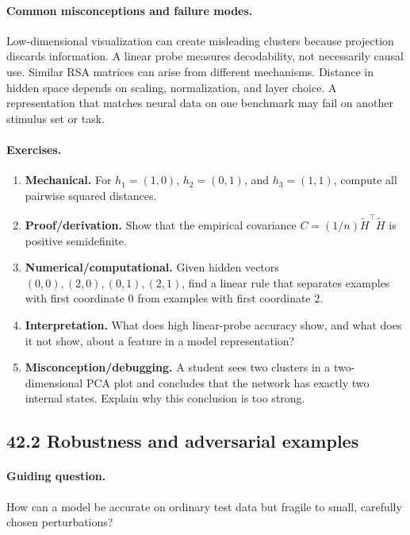 \paragraph{Common misconceptions and failure modes.}
Low-dimensional visualization can create misleading clusters because projection discards information. A linear probe measures decodability, not necessarily causal use. Similar RSA matrices can arise from different mechanisms. Distance in hidden space depends on scaling, normalization, and layer choice. A representation that matches neural data on one benchmark may fail on another stimulus set or task.

\paragraph{Exercises.}
\begin{enumerate}[label=\textbf{42.1.\arabic*.}, leftmargin=*]
\item \textbf{Mechanical.} For \(h_1=(1,0)\), \(h_2=(0,1)\), and \(h_3=(1,1)\), compute all pairwise squared distances.
\item \textbf{Proof/derivation.} Show that the empirical covariance \(C=(1/n)\widetilde H^\top\widetilde H\) is positive semidefinite.
\item \textbf{Numerical/computational.} Given hidden vectors \((0,0),(2,0),(0,1),(2,1)\), find a linear rule that separates examples with first coordinate \(0\) from examples with first coordinate \(2\).
\item \textbf{Interpretation.} What does high linear-probe accuracy show, and what does it not show, about a feature in a model representation?
\item \textbf{Misconception/debugging.} A student sees two clusters in a two-dimensional PCA plot and concludes that the network has exactly two internal states. Explain why this conclusion is too strong.
\end{enumerate}

\subsection{42.2 Robustness and adversarial examples}

\paragraph{Guiding question.}
How can a model be accurate on ordinary test data but fragile to small, carefully chosen perturbations?

